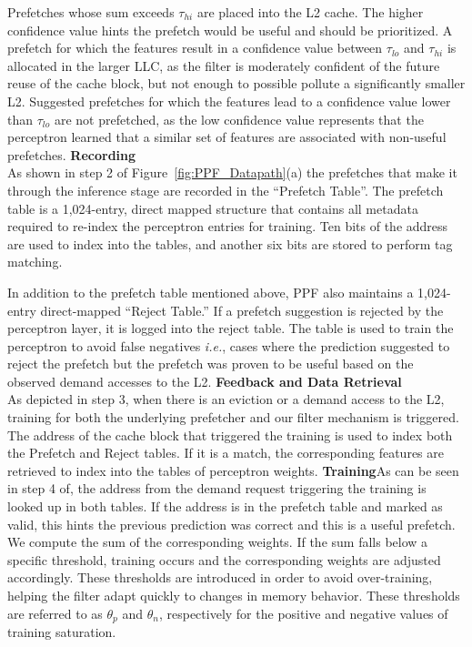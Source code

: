 Prefetches whose sum exceeds $\tau_{hi}$ are placed into the L2 cache.
The higher confidence value hints the prefetch would be useful and
should be prioritized.  A prefetch for which the features result in a
confidence value between $\tau_{lo}$ and $\tau_{hi}$ is allocated in
the larger LLC, as the filter is moderately confident of the future
reuse of the cache block, but not enough to possible pollute a
significantly smaller L2.  Suggested prefetches for which the features
lead to a confidence value lower than $\tau_{lo}$ are not prefetched,
as the low confidence value represents that the perceptron learned
that a similar set of features are associated with non-useful
prefetches.
\newline
\newline
\noindent \textbf{Recording}\\
As shown in step 2 of Figure~\ref{fig:PPF_Datapath}(a) the prefetches
that make it through the inference stage are recorded in the
``Prefetch Table''. The prefetch table is a 1,024-entry, direct mapped
structure that contains all metadata required to re-index the
perceptron entries for training. {Ten bits of the address are 
used to index into the tables, and another six bits are stored to 
perform tag matching.} 

In addition to the prefetch table mentioned above, PPF also maintains
a 1,024-entry direct-mapped ``Reject Table.'' If a prefetch suggestion
is rejected by the perceptron layer, it is logged into the reject
table. The table is used to train the perceptron to avoid false
negatives \textit{i.e.}, cases where the prediction suggested to
reject the prefetch but the prefetch was proven to be useful based on
the observed demand accesses to the L2.
\newline
\newline
\noindent \textbf{Feedback and Data Retrieval}\\
As depicted in step 3, when there is an eviction or a demand access 
to the L2, training for both the {underlying} prefetcher 
and our filter mechanism is triggered. The address of the cache block 
that triggered the training is used to index both the Prefetch and 
Reject tables. {If it is a match, the corresponding
features are retrieved to index into the tables of perceptron weights.}
%
\newline
\newline
\noindent \textbf{Training}\newline As can be seen in step 4 of, 
the address from the demand
request triggering the training is looked up in both tables. If the
address is in the prefetch table and marked as valid, this hints the
previous prediction was correct and this is a useful prefetch. We
compute the sum of the corresponding weights. If the sum falls below a
specific threshold, training occurs and the corresponding weights are
adjusted accordingly. These thresholds are introduced in order to
avoid over-training, helping the filter adapt quickly to changes in
memory behavior. These thresholds are referred to as $\theta_p$ and
$\theta_n$, respectively for the positive and negative values of
training saturation.

